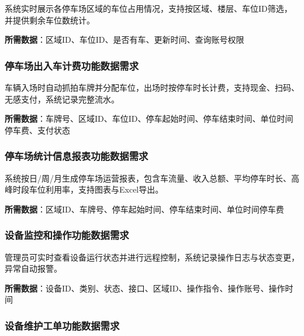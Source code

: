 \documentclass[]{article}
\begin{document}
系统实时展示各停车场区域的车位占用情况，支持按区域、楼层、车位ID筛选，并提供剩余车位数统计。

\textbf{所需数据}：区域ID、车位ID、是否有车、更新时间、查询账号权限

\hypertarget{ux505cux8f66ux573aux51faux5165ux8f66ux8ba1ux8d39ux529fux80fdux6570ux636eux9700ux6c42}{%
  \subsubsection{停车场出入车计费功能数据需求}\label{ux505cux8f66ux573aux51faux5165ux8f66ux8ba1ux8d39ux529fux80fdux6570ux636eux9700ux6c42}}

车辆入场时自动抓拍车牌并分配车位，出场时按停车时长计费，支持现金、扫码、无感支付，系统记录完整流水。

\textbf{所需数据}：车牌号、区域ID、车位ID、停车起始时间、停车结束时间、单位时间停车费、支付状态

\hypertarget{ux505cux8f66ux573aux7edfux8ba1ux4fe1ux606fux62a5ux8868ux529fux80fdux6570ux636eux9700ux6c42}{%
  \subsubsection{停车场统计信息报表功能数据需求}\label{ux505cux8f66ux573aux7edfux8ba1ux4fe1ux606fux62a5ux8868ux529fux80fdux6570ux636eux9700ux6c42}}

系统按日/周/月生成停车场运营报表，包含车流量、收入总额、平均停车时长、高峰时段车位利用率，支持图表与Excel导出。

\textbf{所需数据}：区域ID、车牌号、停车起始时间、停车结束时间、单位时间停车费

\hypertarget{ux8bbeux5907ux76d1ux63a7ux548cux64cdux4f5cux529fux80fdux6570ux636eux9700ux6c42}{%
  \subsubsection{设备监控和操作功能数据需求}\label{ux8bbeux5907ux76d1ux63a7ux548cux64cdux4f5cux529fux80fdux6570ux636eux9700ux6c42}}

管理员可实时查看设备运行状态并进行远程控制，系统记录操作日志与状态变更，异常自动报警。

\textbf{所需数据}：设备ID、类别、状态、接口、区域ID、操作指令、操作账号、操作时间

\hypertarget{ux8bbeux5907ux7ef4ux62a4ux5de5ux5355ux529fux80fdux6570ux636eux9700ux6c42}{%
  \subsubsection{设备维护工单功能数据需求}\label{ux8bbeux5907ux7ef4ux62a4ux5de5ux5355ux529fux80fdux6570ux636eux9700ux6c42}}
\end{document}

